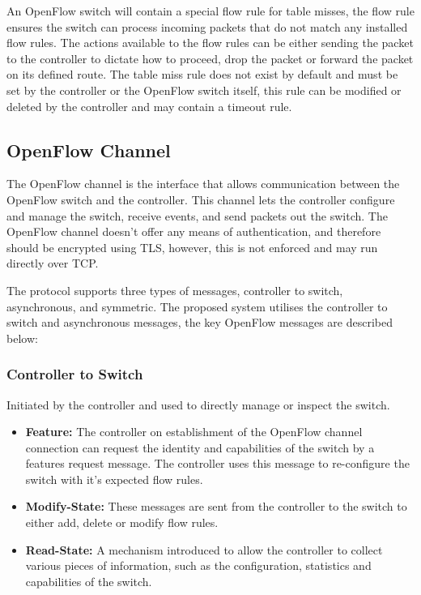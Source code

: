 \documentclass[12pt, oneside]{book}
\begin{document}
An OpenFlow switch will contain a special flow rule for table misses, the flow rule ensures the switch can process incoming packets
that do not match any installed flow rules. The actions available to the flow rules can be either sending the packet to the 
controller to dictate how to proceed, drop the packet or forward the packet on its defined route.
The table miss rule does not exist by default and must be set by the controller or the OpenFlow switch itself, this rule
can be modified or deleted by the controller and may contain a timeout rule.

\newpage
\subsection{OpenFlow Channel}
The OpenFlow channel is the interface that allows communication between the OpenFlow switch and the controller.
This channel lets the controller configure and manage the switch, receive events, and send packets out the switch.
The OpenFlow channel doesn't offer any means of authentication, and therefore should be encrypted using TLS,
however, this is not enforced and may run directly over TCP\cite{openflow}.

The protocol supports three types of messages, controller to switch, asynchronous, and symmetric.
The proposed system utilises the controller to switch and asynchronous messages, the
key OpenFlow messages are described below:

\subsubsection{Controller to Switch}
Initiated by the controller and used to
directly manage or inspect the switch.
\begin{itemize}
	\itemsep0em
	\item \textbf{Feature:} The controller on establishment of the OpenFlow channel connection can request the identity
				and capabilities of the switch by a features request message. The controller uses this message to re-configure the
				switch with it's expected flow rules.
	\item \textbf{Modify-State:} These messages are sent from the controller to the switch to either
				add, delete or modify flow rules.
	\item \textbf{Read-State:} A mechanism introduced to allow the controller to collect various pieces of information,
				such as the configuration, statistics and capabilities of the switch.
\end{itemize}
\end{document}
